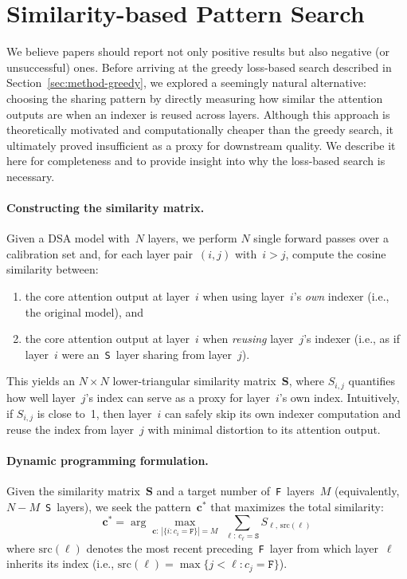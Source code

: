 \section{Similarity-based Pattern Search}
\label{app:similarity-search}
We believe papers should report not only positive results but also negative (or unsuccessful) ones.
Before arriving at the greedy loss-based search described in Section~\ref{sec:method-greedy}, we explored a seemingly natural alternative: choosing the sharing pattern by directly measuring how similar the attention outputs are when an indexer is reused across layers.
Although this approach is theoretically motivated and computationally cheaper than the greedy search, it ultimately proved insufficient as a proxy for downstream quality.
We describe it here for completeness and to provide insight into why the loss-based search is necessary.

\paragraph{Constructing the similarity matrix.}
Given a DSA model with~$N$ layers, we perform $N$ single forward passes over a calibration set and, for each layer pair~$(i, j)$ with~$i > j$, compute the cosine similarity between:
\begin{enumerate}[leftmargin=*,itemsep=1pt]
    \item the core attention output at layer~$i$ when using layer~$i$'s \emph{own} indexer (i.e., the original model), and
    \item the core attention output at layer~$i$ when \emph{reusing} layer~$j$'s indexer (i.e., as if layer~$i$ were an~\texttt{S}~layer sharing from layer~$j$).
\end{enumerate}
This yields an $N \times N$ lower-triangular similarity matrix~$\mathbf{S}$, where $S_{i,j}$ quantifies how well layer~$j$'s index can serve as a proxy for layer~$i$'s own index.
Intuitively, if $S_{i,j}$ is close to~1, then layer~$i$ can safely skip its own indexer computation and reuse the index from layer~$j$ with minimal distortion to its attention output.

\paragraph{Dynamic programming formulation.}
Given the similarity matrix~$\mathbf{S}$ and a target number of~\texttt{F}~layers~$M$ (equivalently, $N - M$~\texttt{S}~layers), we seek the pattern~$\mathbf{c}^*$ that maximizes the total similarity:
\begin{equation}
    \mathbf{c}^* = \arg\max_{\mathbf{c}:\, |\{i : c_i = \texttt{F}\}| = M} \;\sum_{\ell:\, c_\ell = \texttt{S}} S_{\ell,\, \mathrm{src}(\ell)}
\end{equation}
where $\mathrm{src}(\ell)$ denotes the most recent preceding~\texttt{F}~layer from which layer~$\ell$ inherits its index (i.e., $\mathrm{src}(\ell) = \max\{j < \ell : c_j = \texttt{F}\}$).

